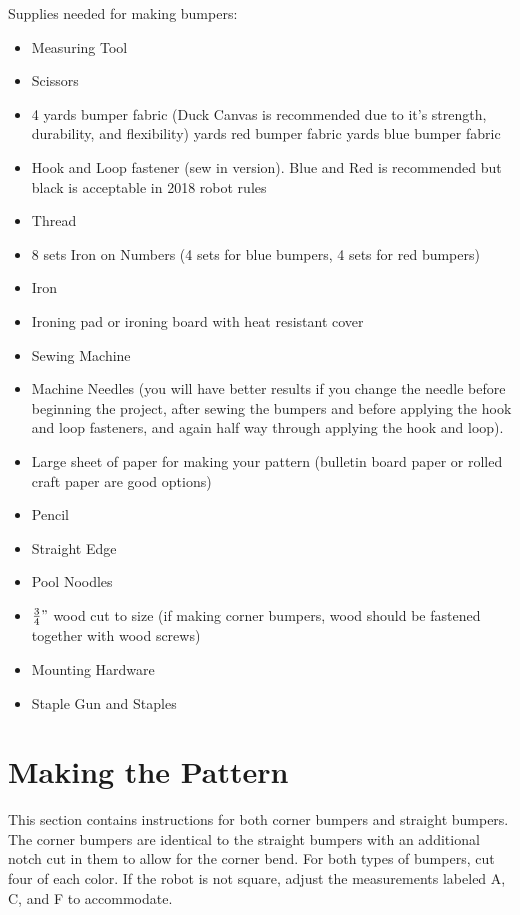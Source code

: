 \documentclass[
10pt, %
a4paper, %
oneside, %
headinclude,footinclude, %
BCOR5mm, %
]{scrartcl}
\begin{document}
Supplies needed for making bumpers:
\begin{itemize}
	\item Measuring Tool
	\item Scissors
	\item 4 yards bumper fabric (Duck Canvas is recommended due to it's strength, durability, and flexibility)
		 yards red bumper fabric
		 yards blue bumper fabric
	\item Hook and Loop fastener (sew in version). Blue and Red is recommended but black is acceptable in 2018 robot rules
	\item Thread
	\item 8 sets Iron on Numbers (4 sets for blue bumpers, 4 sets for red bumpers)
	\item Iron
	\item Ironing pad or ironing board with heat resistant cover
	\item Sewing Machine
	\item Machine Needles (you will have better results if you change the needle before beginning the project, after sewing the bumpers and before applying the hook and loop fasteners, and again half way through applying the hook and loop).
	\item Large sheet of paper for making your pattern (bulletin board paper or rolled craft paper are good options)
	\item Pencil
	\item Straight Edge
	\item Pool Noodles
	\item $\frac{3}{4}"$ wood cut to size (if making corner bumpers, wood should be fastened together with wood screws)
	\item Mounting Hardware
	\item Staple Gun and Staples
\end{itemize}


\section{Making the Pattern}

This section contains instructions for both corner bumpers and straight bumpers. The corner bumpers are identical to the straight bumpers with an additional notch cut in them to allow for the corner bend. For both types of bumpers, cut four of each color. If the robot is not square, adjust the measurements labeled A, C, and F to accommodate.
\end{document}
